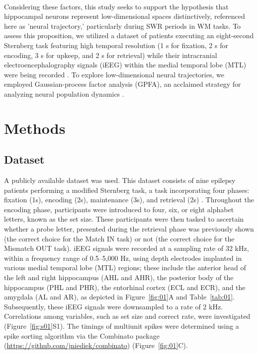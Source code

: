 \documentclass[final,3p,times,twocolumn]{elsarticle}
\begin{document}
\\
\indent
Considering these factors, this study seeks to support the hypothesis that hippocampal neurons represent low-dimensional spaces distinctively, referenced here as 'neural trajectory,' particularly during SWR periods in WM tasks. To assess this proposition, we utilized a dataset of patients executing an eight-second Sternberg task featuring high temporal resolution (1 s for fixation, 2 s for encoding, 3 s for upkeep, and 2 s for retrieval) while their intracranial electroencephalography signals (iEEG) within the medial temporal lobe (MTL) were being recorded \cite{boran_dataset_2020}. To explore low-dimensional neural trajectories, we employed Gaussian-process factor analysis (GPFA), an acclaimed strategy for analyzing neural population dynamics \cite{yu_gaussian-process_2009}.
\label{sec:introduction}
\section{Methods}
\subsection{Dataset}
A publicly available dataset \cite{boran_dataset_2020} was used. This dataset consists of nine epilepsy patients performing a modified Sternberg task, a task incorporating four phases: fixation (1s), encoding (2s), maintenance (3s), and retrieval (2s) \cite{boran_dataset_2020}. Throughout the encoding phase, participants were introduced to four, six, or eight alphabet letters, known as the set size. These participants were then tasked to ascertain whether a probe letter, presented during the retrieval phase was previously shown (the correct choice for the Match IN task) or not (the correct choice for the Mismatch OUT task). iEEG signals were recorded at a sampling rate of 32 kHz, within a frequency range of 0.5--5,000 Hz, using depth electrodes implanted in various medial temporal lobe (MTL) regions; these include the anterior head of the left and right hippocampus (AHL and AHR), the posterior body of the hippocampus (PHL and PHR), the entorhinal cortex (ECL and ECR), and the amygdala (AL and AR), as depicted in Figure~\ref{fig:01}A and Table~\ref{tab:01}. Subsequently, these iEEG signals were downsampled to a rate of 2 kHz. Correlations among variables, such as set size and correct rate, were investigated (Figure~\ref{fig:s01}S1). The timings of multiunit spikes were determined using a spike sorting algorithm \cite{niediek_reliable_2016} via the Combinato package (\url{https://github.com/jniediek/combinato}) (Figure~\ref{fig:01}C).
\end{document}
